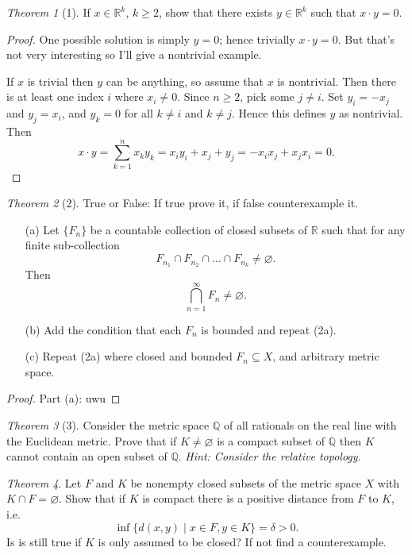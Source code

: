 \documentclass[12pt]{article}
\theoremstyle{remark}
\theoremstyle{named}
\newtheorem*{theorem}{Theorem}
\begin{document}
\begin{theorem}[1]
    If \(x \in \mathbb R^k\), \(k \ge 2\), show that there exists \(y \in \mathbb R^k\) such that \(x \cdot y = 0\).
\end{theorem}

\begin{proof}
    One possible solution is simply \(y = 0\); hence trivially \(x \cdot y = 0\). But that's not very interesting so I'll give a nontrivial example.

    If \(x\) is trivial then \(y\) can be anything, so assume that \(x\) is nontrivial. Then there is at least one index \(i\) where \(x_i \neq 0\). Since \(n \ge 2\), pick some \(j \neq i\). Set \(y_i = -x_j\) and \(y_j = x_i\), and \(y_k = 0\) for all \(k \neq i\) and \(k \neq j\). Hence this defines \(y\) as nontrivial. Then 
    \[x \cdot y = \sum_{k = 1}^n x_k y_k = x_i y_i + x_j + y_j = - x_i x_j + x_j x_i = 0.\]
\end{proof}

\begin{theorem}[2]
    True or False: If true prove it, if false counterexample it.
    \begin{enumerate}
        \item [(a)] Let \(\{F_n\}\) be a countable collection of closed subsets of \(\mathbb R\) such that for any finite sub-collection 
        \[F_{n_1} \cap F_{n_2} \cap \dots \cap F_{n_k} \neq \varnothing.\]
        Then 
        \[\bigcap_{n = 1}^\infty F_n \neq \varnothing.\]
        \item [(b)] Add the condition that each \(F_n\) is bounded and repeat (2a).
        \item [(c)] Repeat (2a) where closed and bounded \(F_n \subseteq X\), and arbitrary metric space.
    \end{enumerate}
\end{theorem}

\begin{proof}
    Part (a): uwu
\end{proof}

\begin{theorem}[3]
    Consider the metric space \(\mathbb Q\) of all rationals on the real line with the Euclidean metric. Prove that if \(K \neq \varnothing\) is a compact subset of \(\mathbb Q\) then \(K\) cannot contain an open subset of \(\mathbb Q\). \textit{Hint: Consider the relative topology.}
\end{theorem}

\begin{theorem}
    Let \(F\) and \(K\) be nonempty closed subsets of the metric space \(X\) with \(K \cap F = \varnothing\). Show that if \(K\) is compact there is a positive distance from \(F\) to \(K\), i.e.
    \[\inf \{d(x, y) \mid x \in F, y \in K\} = \delta > 0.\]
    Is is still true if \(K\) is only assumed to be closed? If not find a counterexample.
\end{theorem}
\end{document}
